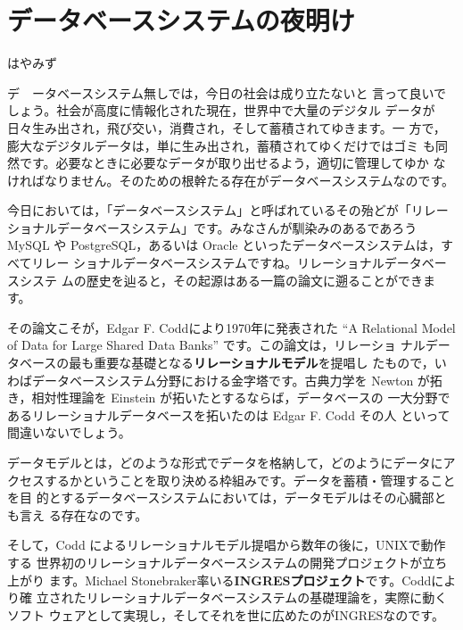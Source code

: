 

\cleardoublepage
\plainifnotempty


\chapter{データベースシステムの夜明け}


\begin{flushright}
はやみず
\end{flushright}


\lettrine{デ} \ \ ータベースシステム無しでは，今日の社会は成り立たないと
言って良いでしょう。社会が高度に情報化された現在，世界中で大量のデジタル
データが日々生み出され，飛び交い，消費され，そして蓄積されてゆきます。一
方で，膨大なデジタルデータは，単に生み出され，蓄積されてゆくだけではゴミ
も同然です。必要なときに必要なデータが取り出せるよう，適切に管理してゆか
なければなりません。そのための根幹たる存在がデータベースシステムなのです。


今日においては，「データベースシステム」と呼ばれているその殆どが「リレー
ショナルデータベースシステム」です。みなさんが馴染みのあるであろう MySQL
や PostgreSQL，あるいは Oracle といったデータベースシステムは，すべてリレー
ショナルデータベースシステムですね。リレーショナルデータベースシステ
ムの歴史を辿ると，その起源はある一篇の論文に遡ることができます。


その論文こそが，Edgar F.  Coddにより1970年に発表された ``A Relational
Model of Data for Large Shared Data Banks'' です。この論文は，リレーショ
ナルデータベースの最も重要な基礎となる{\bf リレーショナルモデル}を提唱し
たもので，いわばデータベースシステム分野における金字塔です。古典力学を
Newton が拓き，相対性理論を Einstein が拓いたとするならば，データベースの
一大分野であるリレーショナルデータベースを拓いたのは Edgar F. Codd その人
といって間違いないでしょう。


データモデルとは，どのような形式でデータを格納して，どのようにデータにア
クセスするかということを取り決める枠組みです。データを蓄積・管理することを目
的とするデータベースシステムにおいては，データモデルはその心臓部とも言え
る存在なのです。


そして，Codd によるリレーショナルモデル提唱から数年の後に，UNIXで動作する
世界初のリレーショナルデータベースシステムの開発プロジェクトが立ち上がり
ます。Michael Stonebraker率いる{\bf INGRESプロジェクト}です。Coddにより確
立されたリレーショナルデータベースシステムの基礎理論を，実際に動くソフト
ウェアとして実現し，そしてそれを世に広めたのがINGRESなのです。


